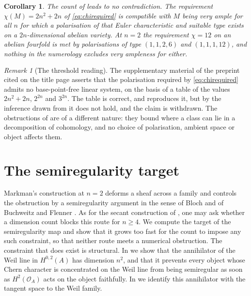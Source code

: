 \documentclass[11pt,reqno]{amsart}
\theoremstyle{plain}
\newtheorem{corollary}[theorem]{Corollary}
\theoremstyle{definition}
\theoremstyle{remark}
\newtheorem{remark}[theorem]{Remark}
\newcommand{\cO}{\mathcal{O}}
\begin{document}
\begin{corollary}\label{cor:nonumerical}
The count of  leads to no contradiction. The
requirement $\chi(M)=2n^{2}+2n$ of \eqref{eq:chirequired} is compatible with
$M$ being very ample for all $n$ for which a polarisation of that Euler
characteristic and suitable type exists on a $2n$-dimensional abelian
variety. At $n=2$ the requirement $\chi=12$ on an abelian fourfold is met by
polarisations of type $(1,1,2,6)$ and $(1,1,1,12)$, and nothing in the
numerology excludes very ampleness for either.
\end{corollary}

\begin{remark}[The threshold reading]\label{rem:retract}
The supplementary material of the preprint cited on the title page asserts that the polarisation required by \eqref{eq:chirequired} admits no
base-point-free linear system, on the basis of a table of the values
$2n^{2}+2n$, $2^{2n}$ and $3^{2n}$. The table is correct, and
 reproduces it, but by  the
inference drawn from it does not hold, and the claim is withdrawn. The obstructions of
 are of a different nature: they bound where
a class can lie in a decomposition of cohomology, and no choice of
polarisation, ambient space or object affects them.
\end{remark}
\section{The semiregularity target}\label{sec:semireg}

Markman's construction at $n=2$ deforms a sheaf across a family and controls
the obstruction by a semiregularity argument in the sense of Bloch and of
Buchweitz and Flenner \cite{Blo72,BF03}. As for the secant construction of
, one may ask whether a dimension count blocks this route
for $n\ge4$. We compute the target of the semiregularity map and show that it
grows too fast for the count to impose any such constraint, so that neither
route meets a numerical obstruction. The constraint that does exist is
structural. In  we show that the annihilator of the Weil
line in $H^{0,2}(A)$ has dimension $n^{2}$, and that it prevents every object
whose Chern character is concentrated on the Weil line from being
semiregular as soon as $H^{2}(\cO_{A})$ acts on the object faithfully. In
 we identify this annihilator with the tangent space to the
Weil family.
\end{document}
